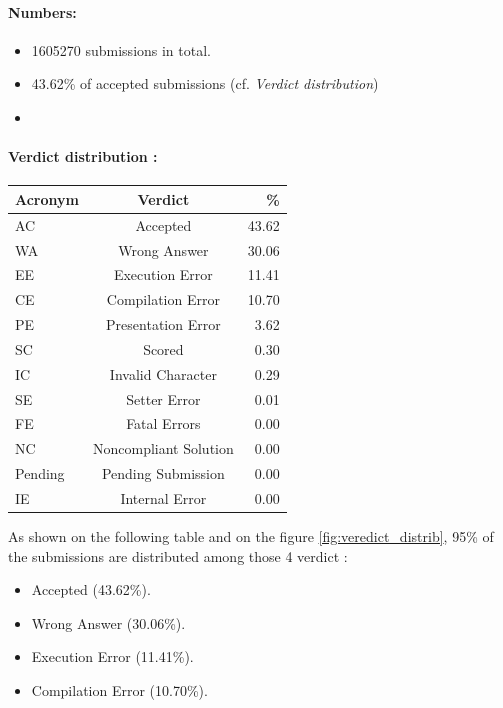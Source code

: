 \documentclass[../main.tex]{subfiles}
\begin{document}
\paragraph{Numbers:}%
\begin{itemize}
	\setlength\itemsep{0em}
	\item 1605270 submissions in total.
	\item 43.62\% of accepted submissions (cf. \emph{Verdict distribution})
	\item 
\end{itemize}


\paragraph{Verdict distribution :}%
\begin{center}
\begin{tabular}{lcr}
\toprule
 Acronym &                Verdict &     \% \\
\midrule
      AC &               Accepted &   43.62 \\
      WA &           Wrong Answer &   30.06 \\
      EE &        Execution Error &   11.41 \\
      CE &      Compilation Error &   10.70 \\
      PE &     Presentation Error &    3.62 \\
      SC &                 Scored &    0.30 \\
      IC &      Invalid Character &    0.29 \\
      SE &           Setter Error &    0.01 \\
      FE &           Fatal Errors &    0.00 \\
      NC &  Noncompliant Solution &    0.00 \\
 Pending &     Pending Submission &    0.00 \\
      IE &         Internal Error &    0.00 \\
\bottomrule
\end{tabular}
\end{center}

As shown on the following table and on the figure \ref{fig:veredict_distrib}, 95\% of the submissions are distributed among those 4 verdict :
\begin{itemize}
	\setlength\itemsep{0em}
	\item Accepted (43.62\%).
	\item Wrong Answer (30.06\%).
	\item Execution Error (11.41\%).
	\item Compilation Error (10.70\%).
\end{itemize}
\end{document}
